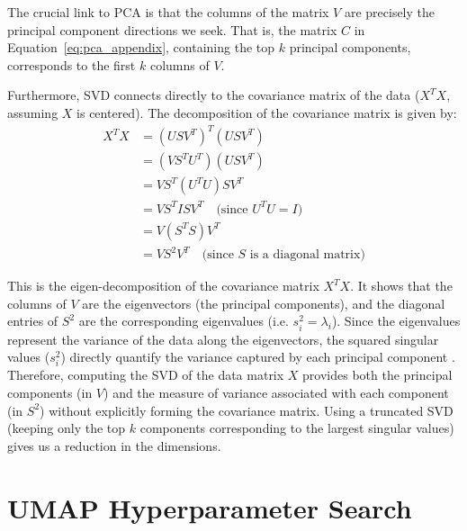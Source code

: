 \documentclass[10pt,oneside]{report}
\begin{document}
The crucial link to PCA is that the columns of the matrix $V$ are precisely the principal component directions we seek. That is, the matrix $C$ in Equation~\ref{eq:pca_appendix}, containing the top $k$ principal components, corresponds to the first $k$ columns of $V$. %

Furthermore, SVD connects directly to the covariance matrix of the data ($X^TX$, assuming $X$ is centered). The decomposition of the covariance matrix is given by:
\begin{align}
    X^TX &= (USV^T)^T (USV^T) \\ %
         &= (VS^T U^T) (USV^T) \\ %
         &= V S^T (U^T U) S V^T \\ %
         &= V S^T I S V^T \quad \text{(since } U^T U = I \text{)} \\
         &= V (S^T S) V^T \\
         &= V S^2 V^T\quad \text{(since } S \text{ is a diagonal matrix)}
         \label{eq:svd_covariance_appendix} %
\end{align}

This is the eigen-decomposition of the covariance matrix $X^TX$. It shows that the columns of $V$ are the eigenvectors (the principal components), and the diagonal entries of $S^2$  are the corresponding eigenvalues (i.e. $s_i^2 = \lambda_i$). Since the eigenvalues represent the variance of the data along the eigenvectors, the squared singular values ($s_i^2$) directly quantify the variance captured by each principal component \cite{udell2016generalized}. Therefore, computing the SVD of the data matrix $X$ provides both the principal components (in $V$) and the measure of variance associated with each component (in $S^2$) without explicitly forming the covariance matrix. Using a truncated SVD (keeping only the top $k$ components corresponding to the largest singular values) gives us a reduction in the dimensions.

\section{UMAP Hyperparameter Search} \label{app:umaphypgrid}
\end{document}
